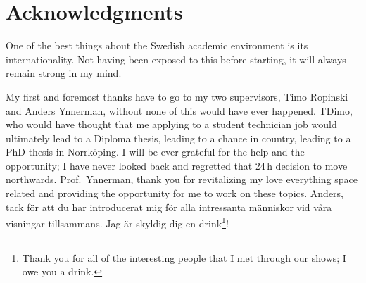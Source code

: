 \chapter*{Acknowledgments}
\novocalize

One of the best things about the Swedish academic environment is its internationality. Not having been exposed to this before starting, it will always remain strong in my mind.

My first and foremost thanks have to go to my two supervisors, Timo Ropinski and Anders Ynnerman, without none of this would have ever happened. TDimo, who would have thought that me applying to a student technician job would ultimately lead to a Diploma thesis, leading to a chance in country, leading to a PhD thesis in Norrk\"oping. I will be ever grateful for the help and the opportunity; I have never looked back and regretted that 24\,h decision to move northwards. Prof.~Ynnerman, thank you for revitalizing my love everything space related and providing the opportunity for me to work on these topics. Anders, tack f\"or att du har introducerat mig f\"or alla intressanta m\"anniskor vid v\aa ra visningar tillsammans. Jag \"ar skyldig dig en drink\footnote{Thank you for all of the interesting people that I met through our shows; I owe you a drink.}!



